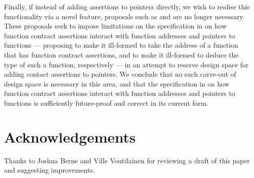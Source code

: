 Finally, if instead of adding assertions to pointers directly, we wish to realise this functionality via a novel feature, proposals such as \cite{P3221R0} and \cite{P3250R0} are no longer necessary. These proposals seek to impose limitations on the specification in \cite{P2900R7} on how function contract assertions interact with function addresses and pointers to functions --- proposing to make it ill-formed to take the address of a function that has function contract assertions, and to make it ill-formed to deduce the type of such a function, respectively --- in an attempt to reserve design space for adding  contact assertions to pointers. We conclude that no such carve-out of design space is necessary in this area, and that the specification in \cite{P2900R7} on how function contract assertions interact with function addresses and pointers to functions is sufficiently future-proof and correct in its current form.



\section*{Acknowledgements}
Thanks to Joshua Berne and Ville Voutilainen for reviewing a draft of this paper and suggesting improvements.




\renewcommand{\addcontentsline}[3]{}%







